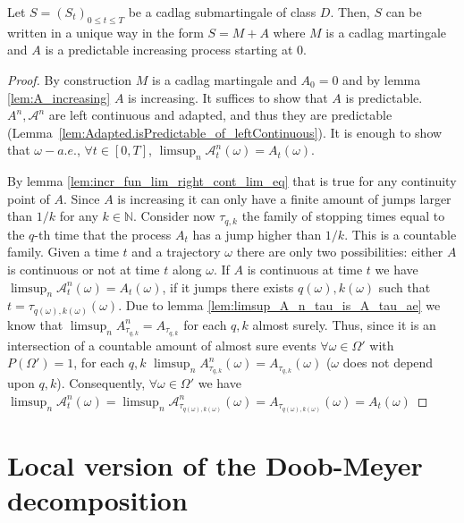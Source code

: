 \begin{theorem}\label{thm:Doob_Meyer}
  Let $S = (S_t )_{0\leq t\leq T}$ be a cadlag submartingale of class $D$.
  Then, $S$ can be written in a unique way in the form  $S = M + A$ where $M$ is a cadlag martingale and $A$ is a predictable increasing process starting at $0$.
\end{theorem}

\begin{proof}
  By construction $M$ is a cadlag martingale and $A_0=0$ and by lemma \ref{lem:A_increasing} $A$ is increasing. It suffices to show that $A$ is predictable.
  $A^n,\mathcal{A}^n$ are left continuous and adapted, and thus they are predictable (Lemma~\ref{lem:Adapted.isPredictable_of_leftContinuous}).
  It is enough to show that $\omega-a.e.$, $\forall t\in[0,T]$, $\limsup_n\mathcal{A}^n_t(\omega)=A_t(\omega)$.

  By lemma \ref{lem:incr_fun_lim_right_cont_lim_eq} that is true for any continuity point of $A$. Since $A$ is increasing it can only have a finite amount of jumps larger than $1/k$ for any $k\in\mathbb{N}$.
  Consider now $\tau_{q,k}$ the family of stopping times equal to the $q$-th time that the process $A_t$ has a jump higher than $1/k$. This is a countable family.
  Given a time $t$ and a trajectory $\omega$ there are only two possibilities: either $A$ is continuous or not at time $t$ along $\omega$.
  If $A$ is continuous at time $t$ we have $\limsup_n\mathcal{A}^n_t(\omega)=A_t(\omega)$, if it jumps there exists $q(\omega),k(\omega)$ such that $t=\tau_{q(\omega),k(\omega)}(\omega)$.
  Due to lemma \ref{lem:limsup_A_n_tau_is_A_tau_ae} we know that $\limsup_n A^n_{\tau_{q,k}} = A_{\tau_{q,k}}$ for each $q,k$ almost surely. Thus, since it is an intersection of a countable amount of almost sure
  events $\forall\omega\in\Omega'$ with $P(\Omega')=1$, for each $q,k$ $\limsup_n A^n_{\tau_{q,k}}(\omega) = A_{\tau_{q,k}}(\omega)$ ($\omega$ does not depend upon $q,k$).
  Consequently, $\forall\omega\in\Omega'$ we have $\limsup_n\mathcal{A}^n_t(\omega)=\limsup_n\mathcal{A}^n_{\tau_{q(\omega),k(\omega)}}(\omega)=A_{\tau_{q(\omega),k(\omega)}}(\omega)=A_t(\omega)$
\end{proof}



\section{Local version of the Doob-Meyer decomposition}


